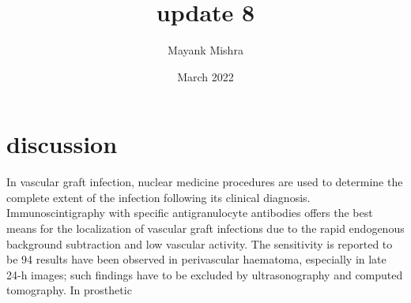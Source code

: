 \documentclass{article}
\title{update 8}
\author{Mayank Mishra }
\date{March 2022}
\begin{document}
\maketitle

\section{discussion}
In vascular graft infection, nuclear medicine procedures
are used to determine the complete extent of the
infection following its clinical diagnosis. Immunoscintigraphy
with specific antigranulocyte antibodies offers
the best means for the localization of vascular graft infections
due to the rapid endogenous background subtraction
and low vascular activity. The sensitivity is reported
to be 94%
results have been observed in perivascular haematoma,
especially in late 24-h images; such findings
have to be excluded by ultrasonography and computed
tomography.
In prosthetic
\end{document}
